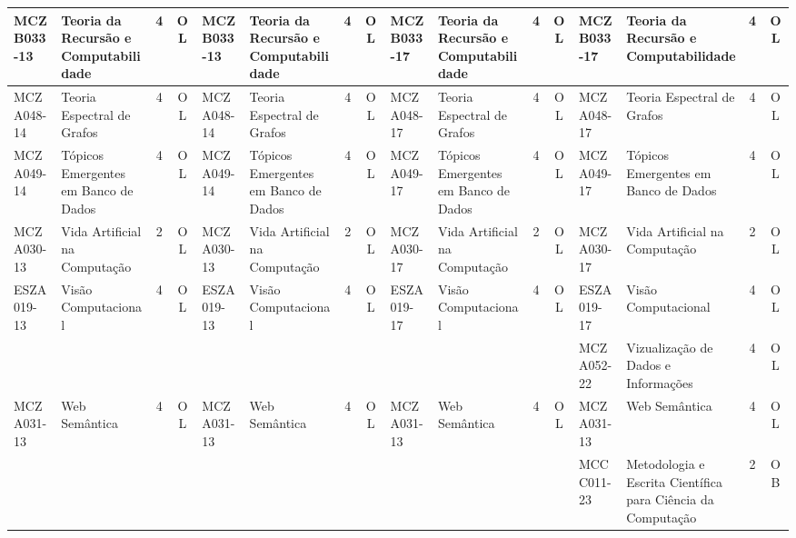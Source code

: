 \documentclass[a4paper]{article}
\begin{document}
\begin{landscape}
{\begin{longtable}{|l|p{.15\textheight}|c|c||l|p{.15\textheight}|c|c||l|p{.15\textheight}|c|c||l|p{.15\textheight}|c|c|}
    MCZB033-13 & Teoria da Recursão e Computabilidade & 4 & OL &
    MCZB033-13 & Teoria da Recursão e Computabilidade & 4 & OL &
    MCZB033-17 & Teoria da Recursão e Computabilidade & 4 & OL &
    MCZB033-17 & Teoria da Recursão e Computabilidade & 4 & OL \\ \hline

    MCZA048-14 & Teoria Espectral de Grafos & 4 & OL &
    MCZA048-14 & Teoria Espectral de Grafos & 4 & OL &
    MCZA048-17 & Teoria Espectral de Grafos & 4 & OL &
    MCZA048-17 & Teoria Espectral de Grafos & 4 & OL \\ \hline

    MCZA049-14 & Tópicos Emergentes em Banco de Dados & 4 & OL &
    MCZA049-14 & Tópicos Emergentes em Banco de Dados & 4 & OL &
    MCZA049-17 & Tópicos Emergentes em Banco de Dados & 4 & OL &
    MCZA049-17 & Tópicos Emergentes em Banco de Dados & 4 & OL \\ \hline

    MCZA030-13 & Vida Artificial na Computação & 2 & OL &
    MCZA030-13 & Vida Artificial na Computação & 2 & OL &
    MCZA030-17 & Vida Artificial na Computação & 2 & OL &
    MCZA030-17 & Vida Artificial na Computação & 2 & OL \\ \hline

    ESZA019-13 & Visão Computacional & 4 & OL &
    ESZA019-13 & Visão Computacional & 4 & OL &
    ESZA019-17 & Visão Computacional & 4 & OL &
    ESZA019-17 & Visão Computacional & 4 & OL \\ \hline

    & & & &
    & & & &
    & & & &
    MCZA052-22 & Vizualização de Dados e Informações & 4 & OL \\ \hline

    MCZA031-13 & Web Semântica & 4 & OL &
    MCZA031-13 & Web Semântica & 4 & OL &
    MCZA031-13 & Web Semântica & 4 & OL &
    MCZA031-13 & Web Semântica & 4 & OL \\ \hline

    &  & & &
    &  & & &
    &  & & &
    MCCC011-23 & Metodologia e Escrita Científica para Ciência da Computação & 2 & OB\\ \hline

\end{longtable}
}
\end{landscape}


\end{document}
